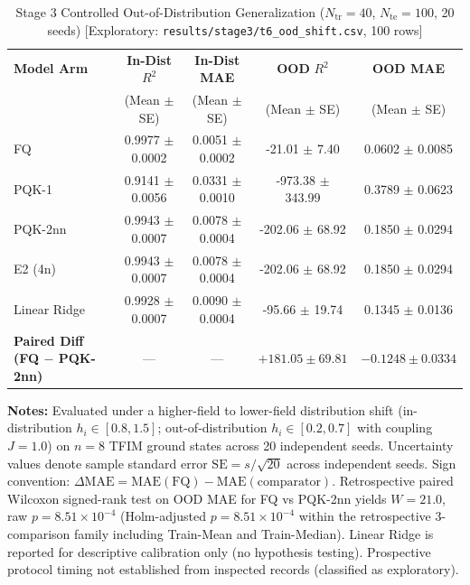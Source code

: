 \begin{table}[!t]
\caption{Stage 3 Controlled Out-of-Distribution Generalization ($N_{\mathrm{tr}}=40$, $N_{\mathrm{te}}=100$, 20 seeds) [Exploratory: \texttt{results/stage3/t6\_ood\_shift.csv}, 100 rows]}
\label{tab:ood}
\centering
\begingroup
\small
\setlength{\tabcolsep}{5pt}
\begin{tabular}{@{}lcccc@{}}
\toprule
\textbf{Model Arm} & \textbf{In-Dist} $R^2$ & \textbf{In-Dist MAE} & \textbf{OOD} $R^2$ & \textbf{OOD MAE} \\
 & (Mean $\pm$ SE) & (Mean $\pm$ SE) & (Mean $\pm$ SE) & (Mean $\pm$ SE) \\
\midrule
FQ & 0.9977 $\pm$ 0.0002 & 0.0051 $\pm$ 0.0002 & -21.01 $\pm$ 7.40 & 0.0602 $\pm$ 0.0085 \\
PQK-1 & 0.9141 $\pm$ 0.0056 & 0.0331 $\pm$ 0.0010 & -973.38 $\pm$ 343.99 & 0.3789 $\pm$ 0.0623 \\
PQK-2nn & 0.9943 $\pm$ 0.0007 & 0.0078 $\pm$ 0.0004 & -202.06 $\pm$ 68.92 & 0.1850 $\pm$ 0.0294 \\
E2 (4n) & 0.9943 $\pm$ 0.0007 & 0.0078 $\pm$ 0.0004 & -202.06 $\pm$ 68.92 & 0.1850 $\pm$ 0.0294 \\
Linear Ridge & 0.9928 $\pm$ 0.0007 & 0.0090 $\pm$ 0.0004 & -95.66 $\pm$ 19.74 & 0.1345 $\pm$ 0.0136 \\
\midrule
\textbf{Paired Diff (FQ $-$ PQK-2nn)} & --- & --- & $+181.05 \pm 69.81$ & $-0.1248 \pm 0.0334$ \\
\bottomrule
\end{tabular}
\endgroup
\vspace{1ex}
{\raggedright \footnotesize \textbf{Notes:} Evaluated under a higher-field to lower-field distribution shift (in-distribution $h_i \in [0.8, 1.5]$; out-of-distribution $h_i \in [0.2, 0.7]$ with coupling $J=1.0$) on $n=8$ TFIM ground states across 20 independent seeds. Uncertainty values denote sample standard error $\mathrm{SE} = s/\sqrt{20}$ across independent seeds. Sign convention: $\Delta\mathrm{MAE} = \mathrm{MAE}(\mathrm{FQ}) - \mathrm{MAE}(\mathrm{comparator})$. Retrospective paired Wilcoxon signed-rank test on OOD MAE for FQ vs PQK-2nn yields $W=21.0$, raw $p=8.51\times 10^{-4}$ (Holm-adjusted $p=8.51\times 10^{-4}$ within the retrospective 3-comparison family including Train-Mean and Train-Median). Linear Ridge is reported for descriptive calibration only (no hypothesis testing). Prospective protocol timing not established from inspected records (classified as exploratory).\par}
\end{table}
